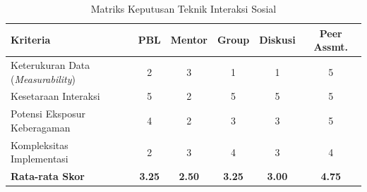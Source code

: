 \begin{table}[H]
    \centering
    \caption{Matriks Keputusan Teknik Interaksi Sosial}
    \label{tbl:solusi-r2}
    \renewcommand{\arraystretch}{1.3} %
    \begin{tabular}{|p{4.0cm}|c|c|c|c|c|}
    \hline
    \textbf{Kriteria} & \textbf{PBL} & \textbf{Mentor} & \textbf{Group} & \textbf{Diskusi} & \textbf{Peer Assmt.} \\
    \hline
    Keterukuran Data (\textit{Measurability}) & 2 & 3 & 1 & 1 & 5 \\
    \hline
    Kesetaraan Interaksi & 5 & 2 & 5 & 5 & 5 \\
    \hline
    Potensi Eksposur Keberagaman & 4 & 2 & 3 & 3 & 5 \\
    \hline
    Kompleksitas Implementasi & 2 & 3 & 4 & 3 & 4 \\
    \hline
    \textbf{Rata-rata Skor} & \textbf{3.25} & \textbf{2.50} & \textbf{3.25} & \textbf{3.00} & \textbf{4.75} \\
    \hline
    \end{tabular}
\end{table}
